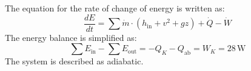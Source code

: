 The equation for the rate of change of energy is written as:  
\[
\frac{dE}{dt} = \sum \dot{m} \cdot (h_{\text{in}} + v^2 + gz) + \dot{Q} - \dot{W}
\]  
The energy balance is simplified as:  
\[
\sum E_{\text{in}} - \sum E_{\text{out}} = -Q_K - Q_{\text{ab}} = W_K = 28 \, \text{W}
\]  
The system is described as adiabatic.